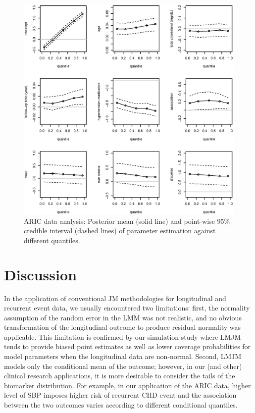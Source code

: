 \restoregeometry
\pagestyle{plain}

\newpage
\begin{figure}[H]
\centering
\includegraphics[width=\textwidth]{0.plots/p2_JM_inference_covs.eps}
\caption{ARIC data analysis: Posterior mean (solid line) and point-wise 95\% credible interval (dashed lines) of parameter estimation against different quantiles.}
\label{p2_jm_infer}
\end{figure}



\section{Discussion}\label{sec:p2discussion}
In the application of conventional JM methodologies for longitudinal and recurrent event data, we usually encountered two limitations: first, the normality assumption of the random error in the LMM was not realistic, and no obvious transformation of the longitudinal outcome to produce residual normality was applicable. This limitation is confirmed by our simulation study where LMJM tends to provide biased point estimates as well as lower coverage probabilities for model parameters when the longitudinal data are non-normal. Second, LMJM models only the conditional mean of the outcome; however, in our (and other) clinical research applications, it is more desirable to consider the tails of the biomarker distribution. For example, in our application of the ARIC data, higher level of SBP imposes higher risk of recurrent CHD event and the association between the two outcomes varies according to different conditional quantiles.


